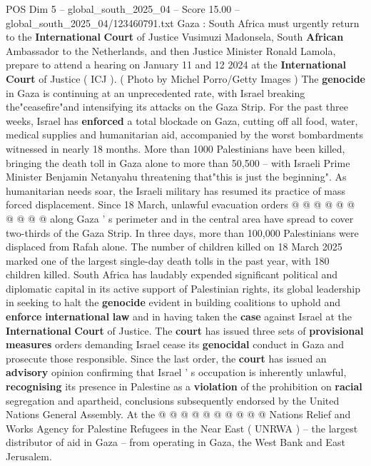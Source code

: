 \begin{textsample}{POS Dim 5 – global\_south\_2025\_04 – Score 15.00 – global\_south\_2025\_04/123460791.txt}  \label{ex:f5_pos_068}
Gaza : South Africa must urgently return to the \textbf{International} \textbf{Court} of Justice Vusimuzi Madonsela, South \textbf{African} Ambassador to the Netherlands, and then Justice Minister Ronald Lamola, prepare to attend a hearing on January 11 and 12 2024 at the \textbf{International} \textbf{Court} of Justice ( ICJ ). ( Photo by Michel Porro/Getty Images ) The \textbf{genocide} in Gaza is continuing at an unprecedented rate, with Israel breaking the"ceasefire"and intensifying its attacks on the Gaza Strip.
For the past three weeks, Israel has \textbf{enforced} a total blockade on Gaza, cutting off all food, water, medical supplies and humanitarian aid, accompanied by the worst bombardments witnessed in nearly 18 months.
More than 1000 Palestinians have been killed, bringing the death toll in Gaza alone to more than 50,500 -- with Israeli Prime Minister Benjamin Netanyahu threatening that"this is just the beginning".
As humanitarian needs soar, the Israeli military has resumed its practice of mass forced displacement.
Since 18 March, unlawful evacuation orders @ @ @ @ @ @ @ @ @ @ along Gaza ' s perimeter and in the central area have spread to cover two-thirds of the Gaza Strip.
In three days, more than 100,000 Palestinians were displaced from Rafah alone.
The number of children killed on 18 March 2025 marked one of the largest single-day death tolls in the past year, with 180 children killed.
South Africa has laudably expended significant political and diplomatic capital in its active support of Palestinian rights, its global leadership in seeking to halt the \textbf{genocide} evident in building coalitions to uphold and \textbf{enforce} \textbf{international} \textbf{law} and in having taken the \textbf{case} against Israel at the \textbf{International} \textbf{Court} of Justice.
The \textbf{court} has issued three sets of \textbf{provisional} \textbf{measures} orders demanding Israel cease its \textbf{genocidal} conduct in Gaza and prosecute those responsible.
Since the last order, the \textbf{court} has issued an \textbf{advisory} opinion confirming that Israel ' s occupation is inherently unlawful, \textbf{recognising} its presence in Palestine as a \textbf{violation} of the prohibition on \textbf{racial} segregation and apartheid, conclusions subsequently endorsed by the United Nations General Assembly.
At the @ @ @ @ @ @ @ @ @ @ Nations Relief and Works Agency for Palestine Refugees in the Near East ( UNRWA ) -- the largest distributor of aid in Gaza -- from operating in Gaza, the West Bank and East Jerusalem.

\end{textsample}
